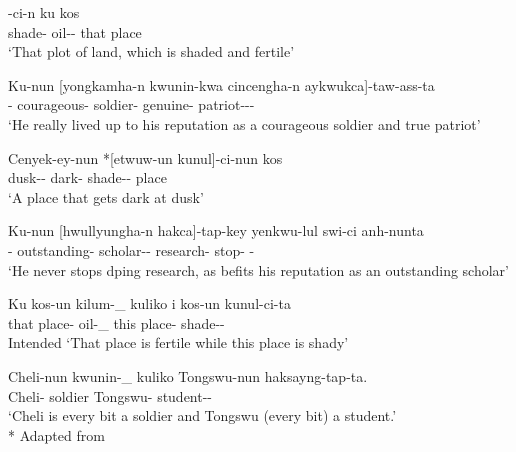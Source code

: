 \begin{exe}
    \ex \label{koreanlexical}
    \begin{xlist}
    \ex \label{koreanconjoined1}
    -ci-n ku kos \\ 
    shade-{\And} oil-{\Der}-{\Rel} that place \\
    \glt `That plot of land, which is shaded and fertile'
    
    \ex \label{koreanconjoined2}
    \gll Ku-nun [yongkamha-n kwunin-kwa cincengha-n aykwukca]-taw-ass-ta\\
    {\Tsg}-{\Top} courageous-{\Rel} soldier-{\And} genuine-{\Rel} patriot-{\Der}-{\Pst}-{\Decl} \\
    \glt `He really lived up to his reputation as a courageous soldier and true patriot'
 
    
    \ex \label{koreanmodified1}
    \gll Cenyek-ey-nun *[etwuw-un kunul]-ci-nun kos \\
    dusk-{\Loc}-{\Top} dark-{\Rel} shade-{\Der}-{\Rel} place\\
    \glt `A place that gets dark at dusk'
    
    \ex \label{koreanmodified2}
    \gll Ku-nun [hwullyungha-n hakca]-tap-key yenkwu-lul swi-ci anh-nunta \\
    {\Tsg}-{\Top} outstanding-{\Rel} scholar-{\Der}-{\Comp} research-{\Acc} stop-{\Comp} {\Neg}-{\Prs} \\
    \glt `He never stops dping research, as befits his reputation as an outstanding scholar'
    
    
    \ex \label{koreangapping1}
    \gll *Ku kos-un kilum-\_ kuliko i kos-un kunul-ci-ta \\
    that place-{\Top} oil-\_ {\And} this place-{\Top} shade-{\Der}-{\Decl} \\
    \glt Intended `That place is fertile while this place is shady'
    
    \ex \label{koreangapping2}
    \gll Cheli-nun kwunin-\_ kuliko Tongswu-nun haksayng-tap-ta. \\ 
    Cheli-{\Top} soldier {\And} Tongswu-{\Top} student-{\Der}-{\Decl} \\
    \glt `Cheli is every bit a soldier and Tongswu (every bit) a student.'\\*
    \hfill Adapted from \cite{yoon2017lexical}
    \end{xlist}
\end{exe}

